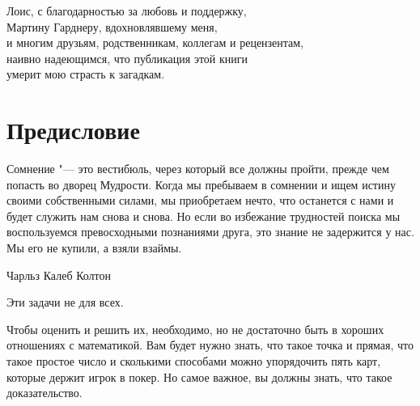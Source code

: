 \documentclass[twoside]{book}
\begin{document}




\clearpage

\null
\thispagestyle{empty}

\clearpage





\thispagestyle{empty}


\vspace*{4\baselineskip}

{
\centering
\em

Лоис, с благодарностью за любовь и поддержку, \\
Мартину Гарднеру, вдохновлявшему меня,\\
и многим друзьям, родственникам, коллегам и рецензентам, \\
наивно надеющимся, что публикация этой книги\\
умерит мою страсть к загадкам.

}
\clearpage

\null
\thispagestyle{empty}

\clearpage

\chapter{Предисловие}

\thispagestyle{empty}

\setlength{\epigraphwidth}{.75\textwidth} %
\epigraph{Сомнение "--- это вестибюль, через который все должны пройти, прежде чем попасть во дворец Мудрости.
Когда мы пребываем в сомнении и ищем истину своими собственными силами, мы приобретаем нечто, что останется с нами и будет служить нам снова и снова.
Но если во избежание трудностей поиска мы воспользуемся превосходными познаниями друга, это знание не задержится у нас.
Мы его не купили, а взяли взаймы.\vspace{1ex}}{Чарльз Калеб Колтон}                                                                                    

Эти задачи не для всех.

Чтобы оценить и решить их, необходимо, но не достаточно быть в хороших отношениях с математикой.
Вам будет нужно знать, что такое точка и прямая, что такое простое число и сколькими способами можно упорядочить пять карт, которые держит игрок в покер.
Но самое важное, вы должны знать, что такое доказательство.
\end{document}
